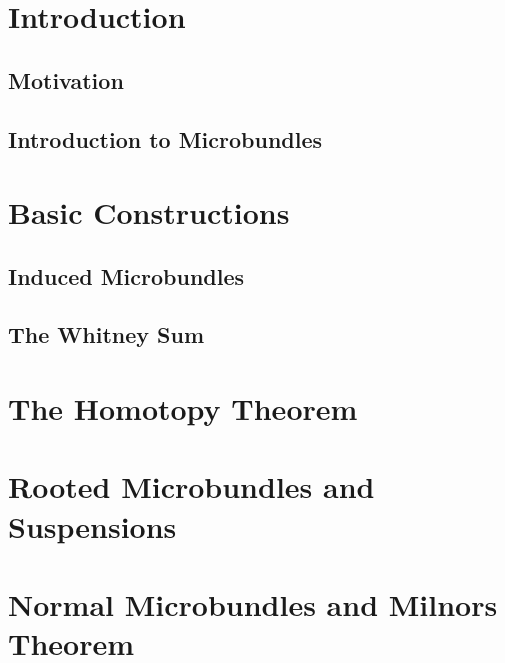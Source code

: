\documentclass[bibliography=totoc]{report}
\begin{document}


\tableofcontents
\clearpage
\chapter{Introduction}\label{chapter::introduction}
\section{Motivation}\label{section::motivation}

\section{Introduction to Microbundles}\label{section::microbundle}

\chapter{Basic Constructions}\label{chapter::constructions}
\section{Induced Microbundles}\label{section::induced}

\section{The Whitney Sum}\label{section::whitney}

\chapter{The Homotopy Theorem}\label{section::homotopy}

\chapter{Rooted Microbundles and Suspensions}\label{chapter::suspension}

\chapter{Normal Microbundles and Milnors Theorem}\label{chapter::normal}


\end{document}
